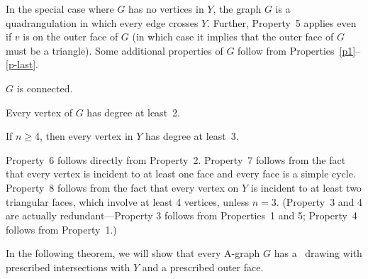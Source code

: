 In the special case where $G$ has no vertices in $Y$, the graph $G$ is a quadrangulation in which every edge crosses $Y$. Further, Property~5 applies even if $v$ is on the outer face of $G$ (in which case it implies that the outer face of $G$ must be a triangle).
Some additional properties of $G$ follow from %
Properties~\ref{p1}--\ref{p-last}.
\begin{compactenum}\setcounter{enumi}{5}
	\item $G$ is connected.
	\item Every vertex of $G$ has degree at least~2.   
	\item If $n\ge 4$, then every vertex in $Y$ has degree at least~3. 
\end{compactenum}
Property~6 follows directly from Property~2.
Property~7 follows from the fact that every vertex is incident to at
least one face and every face is a simple cycle.
Property~8 follows from the fact that every vertex on $Y$ is incident
to at least two triangular faces, which involve at least 4 vertices,
unless $n=3$.
(Property~3 and 4 are actually redundant---Property 3 follows from Properties~1 and 5; Property~4 follows from Property~1.)

%
%

In the following theorem,
we will show that every A-graph $G$ has a \Fary\ drawing with prescribed intersections with $Y$ and a prescribed outer face.

